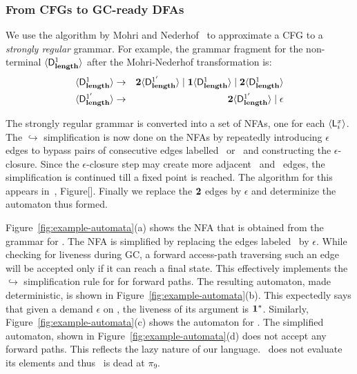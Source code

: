 \documentclass[9pt]{sigplanconf}
\begin{document}
\subsubsection{From CFGs to GC-ready DFAs}
\label{sec:NFA-approx}
 We use  the algorithm by Mohri  and Nederhof~\cite{mohri00regular} to
 approximate a CFG to a {\em strongly regular\/} grammar.  For
 example, the grammar
 fragment  for  the  non-terminal  $\var{\Df{\length}{1}}$  after  the
 Mohri-Nederhof transformation is:
 \begin{eqnarray*}
   \var{\Df{\length}{1}} &\rightarrow& \clazy\var{\Df{\length}{1'}} \mid
   \acdr\var{\Df{\length}{1}}
   \mid \clazy\var{\Df{\length}{1}}\\
   \var{\Df{\length}{1'}} &\rightarrow& \clazy\var{\Df{\length}{1'}}
   \mid \epsilon
 \end{eqnarray*}

The strongly regular grammar is converted into a set of
NFAs,   one  for   each  $\var{\Lanv{i}{x}}$.   The  $\hookrightarrow$
simplification  is now  done  on the  NFAs  by repeatedly  introducing
$\epsilon$  edges  to  bypass  pairs  of  consecutive  edges  labelled
\bcar\acar\ or \bcdr\acdr\  and constructing the
$\epsilon$-closure. Since the $\epsilon$-closure step may create more
adjacent \bcar\acar\ and \bcdr\acdr\  edges, the simplification is
 continued  till a  fixed point is  reached. The algorithm  for this
appears  in~\cite{asati14lgc},   Figure[].  Finally  we   replace  the
${\mathbf{2}}$  edges  by  $\epsilon$  and determinize  the  automaton  thus
formed.

Figure~\ref{fig:example-automata}(a)  shows the  NFA that  is obtained
from the  grammar for  .  The  NFA is
simplified by replacing the edges labeled \clazy\ by $\epsilon$. While
checking for liveness during GC, a forward access-path traversing such
an edge  will be accepted  only if it  can reach a final  state.  This
effectively implements  the $\hookrightarrow$ simplification  rule for
\clazy for forward paths. The resulting automaton, made deterministic,
is shown in Figure~\ref{fig:example-automata}(b). This expectedly says
that  given  a demand  $\epsilon$  on  \length,  the liveness  of  its
argument             is             $\mathbf{1}^{*}$.            Similarly,
Figure~\ref{fig:example-automata}(c)    shows   the    automaton   for
. The simplified automaton, shown in
Figure~\ref{fig:example-automata}(d) does not accept any forward
paths. This reflects the lazy nature of our language. \length\  does not
evaluate its elements and thus \pa\ is dead at $\pi_9$.
\end{document}
